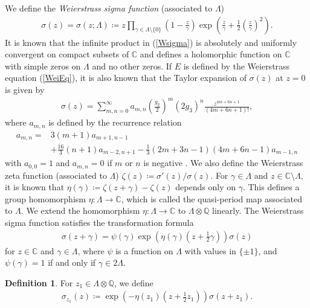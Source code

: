 \documentclass[11pt]{amsart}
\theoremstyle{definition}
\newtheorem{dfn}[thm]{Definition}
\newcommand{\C}{\mathbb{C}}
\begin{document}
We define the {\it Weierstrass sigma function} (associated to $\Lambda$)
%
\begin{align}\label{Wsigma}
\sigma(z)=\sigma(z ; \Lambda) \coloneqq z \prod_{\gamma \in \Lambda \setminus \{0\}} \left(1-\frac{z}{\gamma}\right)\exp \left(\frac{z}{\gamma}+\frac{1}{2}\left(\frac{z}{\gamma}\right)^2\right).
\end{align}
%
It is known that the infinite product in (\ref{Wsigma}) is absolutely and uniformly convergent on compact subsets of $\C$ and defines a holomorphic function on $\mathbb{C}$ with simple zeros on $\Lambda$ and no other zeros. If $E$ is defined by the Weierstrass equation (\ref{WeiEq}), it is also known that the Taylor expansion of $\sigma(z)$ at $z=0$ is given by
%
\begin{align}\label{exp sigma}
\sigma(z)=\sum_{m, n=0}^\infty a_{m, n} \left(\frac{g_2}{2}\right)^m (2g_3)^n \frac{z^{4m+6n+1}}{(4m+6n+1)!},
\end{align}
%
where $a_{m, n}$ is defined by the recurrence relation
%
\begin{align*}
a_{m, n}=&3(m+1)a_{m+1, n-1} \\
&+\frac{16}{3}(n+1)a_{m-2, n+1}-\frac{1}{3}(2m+3n-1)(4m+6n-1)a_{m-1, n}
\end{align*}
%
with $a_{0, 0}=1$ and $a_{m, n}=0$ if $m$ or $n$ is negative \cite[pp. 635--636]{AS64}. 
We also define the Weierstrass zeta function (associated to $\Lambda$) $\zeta(z)\coloneqq \sigma'(z)/\sigma(z).$ For $\gamma \in \Lambda$ and $z \in \mathbb{C} \setminus \Lambda$, it is known that $\eta(\gamma) \coloneqq \zeta(z+\gamma)-\zeta(z)$ depends only on $\gamma$. This defines a group homomorphism $\eta : \Lambda \rightarrow \mathbb{C}$, which is called the quasi-period map associated to $\Lambda$. We extend the homomorphism $\eta : \Lambda \rightarrow \mathbb{C}$ to $\Lambda \otimes \mathbb{Q}$ linearly.
The Weierstrass sigma function satisfies the transformation formula
%
\begin{align}\label{transW}
\sigma(z+\gamma)=\psi(\gamma)\exp \left(\eta(\gamma)\left(z+\frac{1}{2}\gamma\right)\right)\sigma(z)
\end{align}
%
for $z \in \mathbb{C}$ and $\gamma \in \Lambda$, where $\psi$ is a function on $\Lambda$ with values in $\{ \pm 1\}$, and $\psi(\gamma)=1$ if and only if $\gamma \in 2\Lambda$.

\begin{dfn}\label{sigma_z}
For $z_1 \in \Lambda \otimes \mathbb{Q}$, we define
%
\begin{align*}
\sigma_{z_1}(z) \coloneqq \exp \left(-\eta(z_1)\left(z+\frac{1}{2}z_1\right)\right)\sigma(z+z_1).
\end{align*}
%
\end{dfn}
\end{document}
